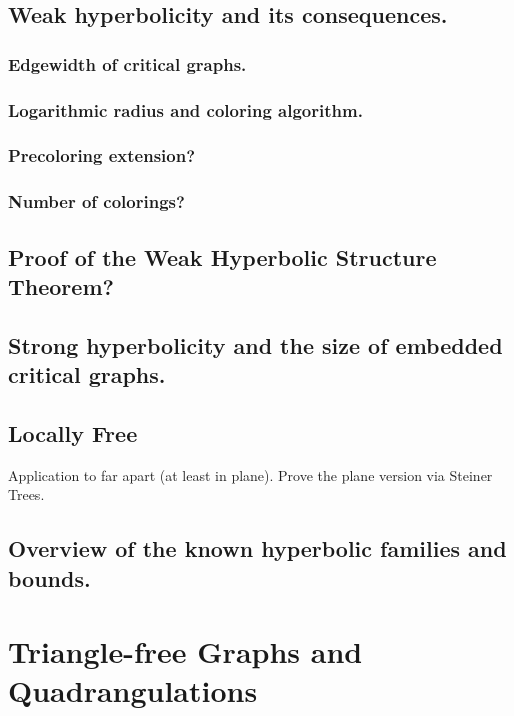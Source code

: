 \documentclass[12pt,twoside,openright,a4paper]{book}
\begin{document}

\section{Weak hyperbolicity and its consequences.}

\subsection{Edgewidth of critical graphs. }
\subsection{Logarithmic radius and coloring algorithm.}
\subsection{Precoloring extension?}
\subsection{Number of colorings? }

\section{Proof of the Weak Hyperbolic Structure Theorem?}

\section{Strong hyperbolicity and the size of embedded critical graphs.}

\section{Locally Free}

Application to far apart (at least in plane). Prove the plane version via Steiner Trees.

\section{Overview of the known hyperbolic families and bounds.}


\chapter{Triangle-free Graphs and Quadrangulations}\label{chap:trfree}

\end{document}

